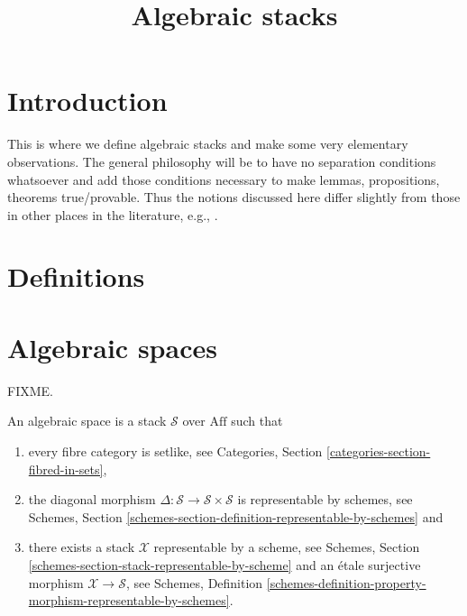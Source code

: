 

%


\title{Algebraic stacks}


\maketitle

\tableofcontents

\section{Introduction}
\label{section-introduction}

\noindent
This is where we define algebraic stacks and make some very elementary
observations. The general philosophy will be to have no separation
conditions whatsoever and add those conditions necessary to make lemmas,
propositions, theorems true/provable. Thus the notions discussed here 
differ slightly from those in other places in the literature, e.g.,
\cite{LM-B}.

\section{Definitions}
\label{section-definitions}

\section{Algebraic spaces}
\label{section-algebraic-spaces}

\noindent
FIXME.

\begin{definition}
An algebraic space is a stack $\mathcal{S}$ over $\text{Aff}$ such that
\begin{enumerate}
\item every fibre category is setlike, see Categories, Section
\ref{categories-section-fibred-in-sets}, 
\item the diagonal morphism
$\Delta : \mathcal{S} \to \mathcal{S}\times\mathcal{S}$
is representable by schemes, see Schemes, Section
\ref{schemes-section-definition-representable-by-schemes} and
\item there exists a stack $\mathcal{X}$ representable by a scheme, see
Schemes, Section \ref{schemes-section-stack-representable-by-scheme}
and an \'etale surjective morphism $\mathcal{X} \to \mathcal{S}$,
see Schemes, Definition
\ref{schemes-definition-property-morphism-representable-by-schemes}.
\end{enumerate}
\end{definition}


